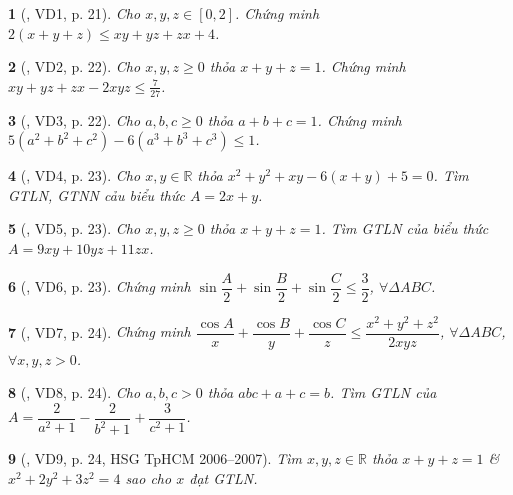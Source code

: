 \documentclass{article}
\newtheorem{baitoan}{}
\begin{document}
\begin{baitoan}[\cite{Hai_Hung_Thu_Tung_ncpt_Toan_10_tap_2}, VD1, p. 21]
	Cho $x,y,z\in[0,2]$. Chứng minh $2(x + y + z)\le xy + yz + zx + 4$.
\end{baitoan}

\begin{baitoan}[\cite{Hai_Hung_Thu_Tung_ncpt_Toan_10_tap_2}, VD2, p. 22]
	Cho $x,y,z\ge0$ thỏa $x + y + z = 1$. Chứng minh $xy + yz + zx - 2xyz\le\frac{7}{27}$.
\end{baitoan}

\begin{baitoan}[\cite{Hai_Hung_Thu_Tung_ncpt_Toan_10_tap_2}, VD3, p. 22]
	Cho $a,b,c\ge0$ thỏa $a + b + c = 1$. Chứng minh $5(a^2 + b^2 + c^2) - 6(a^3 + b^3 + c^3)\le1$.
\end{baitoan}

\begin{baitoan}[\cite{Hai_Hung_Thu_Tung_ncpt_Toan_10_tap_2}, VD4, p. 23]
	Cho $x,y\in\mathbb{R}$ thỏa $x^2 + y^2 + xy - 6(x + y) + 5 = 0$. Tìm {\rm GTLN, GTNN} cảu biểu thức $A = 2x + y$.
\end{baitoan}

\begin{baitoan}[\cite{Hai_Hung_Thu_Tung_ncpt_Toan_10_tap_2}, VD5, p. 23]
	Cho $x,y,z\ge0$ thỏa $x + y + z = 1$. Tìm {\rm GTLN} của biểu thức $A = 9xy + 10yz + 11zx$.
\end{baitoan}

\begin{baitoan}[\cite{Hai_Hung_Thu_Tung_ncpt_Toan_10_tap_2}, VD6, p. 23]
	Chứng minh $\sin\dfrac{A}{2} + \sin\dfrac{B}{2} + \sin\dfrac{C}{2}\le\dfrac{3}{2}$, $\forall\Delta ABC$.
\end{baitoan}

\begin{baitoan}[\cite{Hai_Hung_Thu_Tung_ncpt_Toan_10_tap_2}, VD7, p. 24]
	Chứng minh $\dfrac{\cos A}{x} + \dfrac{\cos B}{y} + \dfrac{\cos C}{z}\le\dfrac{x^2 + y^2 + z^2}{2xyz}$, $\forall\Delta ABC$, $\forall x,y,z > 0$.
\end{baitoan}

\begin{baitoan}[\cite{Hai_Hung_Thu_Tung_ncpt_Toan_10_tap_2}, VD8, p. 24]
	Cho $a,b,c > 0$ thỏa $abc + a + c = b$. Tìm {\rm GTLN} của $A = \dfrac{2}{a^2 + 1} - \dfrac{2}{b^2 + 1} + \dfrac{3}{c^2 + 1}$.
\end{baitoan}

\begin{baitoan}[\cite{Hai_Hung_Thu_Tung_ncpt_Toan_10_tap_2}, VD9, p. 24, HSG TpHCM 2006--2007]
	Tìm $x,y,z\in\mathbb{R}$ thỏa $x + y + z = 1$ \& $x^2 + 2y^2 + 3z^2 = 4$ sao cho $x$ đạt {\rm GTLN}.
\end{baitoan}
\end{document}
